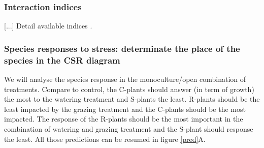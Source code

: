 \documentclass[12pt, a4paper]{article} %
\begin{document}
\subsubsection{Interaction indices}
[...] Detail available indices \citep{Seifan2010}.

\subsubsection{Species responses to stress: determinate the place of the species in the CSR diagram}
We will analyse the species response in the monoculture/open combination of treatments. Compare to control, the C-plants should answer (in term of growth) the most to the watering treatment and S-plants the least. R-plants should be the least impacted by the grazing treatment and the C-plants should be the most impacted. The response of the R-plants should be the most important in the combination of watering and grazing treatment and the S-plant should response the least. All those predictions can be resumed in figure \ref{pred}A.
\end{document}
